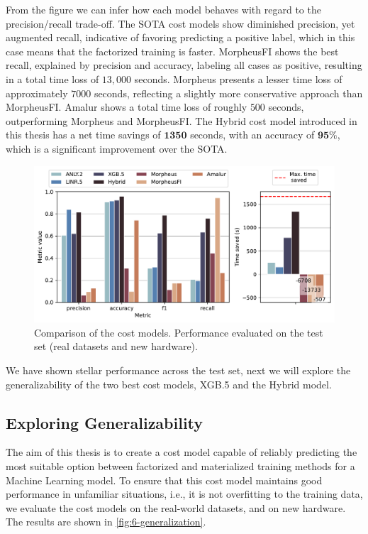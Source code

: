 From the figure we can infer how each model behaves with regard to the precision/recall trade-off. The SOTA cost models show diminished precision, yet augmented recall, indicative of favoring predicting a positive label, which in this case means that the factorized training is faster. MorpheusFI \cite{MorpheusFI} shows the best recall, explained by precision and accuracy, labeling all cases as positive, resulting in a total time loss of $13,000$ seconds. Morpheus \cite{orion_learning_gen_lin_models} presents a lesser time loss of approximately $7000$ seconds, reflecting a slightly more conservative approach than MorpheusFI. Amalur \cite{amalur} shows a total time loss of roughly $500$ seconds, outperforming Morpheus and MorpheusFI. The Hybrid cost model introduced in this thesis has a net time savings of $\mathbf{1350}$ seconds, with an accuracy of $\mathbf{95\%}$, which is a significant improvement over the SOTA.

\begin{figure}[ht]
    \centering
    \includegraphics[width=\linewidth]{chapters/06_evaluation/figures/eval_sota_results.pdf}
    \caption[Cost model comparison vs. SOTA]{Comparison of the cost models. Performance evaluated on the test set (real datasets and new hardware).}
    \label{fig:6-sota-comparison}
\end{figure}

We have shown stellar performance across the test set, next we will explore the generalizability of the two best cost models, XGB.5 and the Hybrid model.

\subsection{Exploring Generalizability}
\label{subsec:6-generalizability}
The aim of this thesis is to create a cost model capable of reliably predicting the most suitable option between factorized and materialized training methods for a Machine Learning model. To ensure that this cost model maintains good performance in unfamiliar situations, i.e., it is not overfitting to the training data, we evaluate the cost models on the real-world datasets, and on new hardware. The results are shown in \autoref{fig:6-generalization}.

